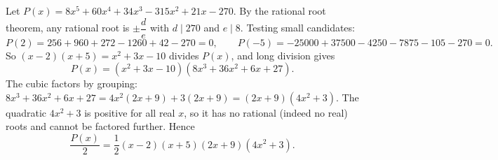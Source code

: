 Let $P(x)=8x^5+60x^4+34x^3-315x^2+21x-270$. By the rational root theorem, any rational root is $\pm\dfrac{d}{e}$ with $d\mid270$ and $e\mid8$. Testing small candidates:
\[P(2)=256+960+272-1260+42-270=0,\qquad P(-5)=-25000+37500-4250-7875-105-270=0.\]
So $(x-2)(x+5)=x^2+3x-10$ divides $P(x)$, and long division gives
\[P(x)=\left(x^2+3x-10\right)\left(8x^3+36x^2+6x+27\right).\]
The cubic factors by grouping: $8x^3+36x^2+6x+27=4x^2(2x+9)+3(2x+9)=(2x+9)\left(4x^2+3\right)$. The quadratic $4x^2+3$ is positive for all real $x$, so it has no rational (indeed no real) roots and cannot be factored further. Hence
\[\dfrac{P(x)}{2}=\boxed{\dfrac12(x-2)(x+5)(2x+9)\left(4x^2+3\right)}.\]
